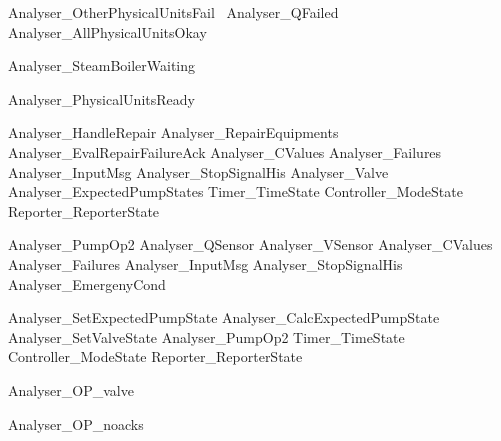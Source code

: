 \documentclass{article}
\begin{document}
\begin{zed}
	Analyser\_OtherPhysicalUnitsFail ~\lnot Analyser\_QFailed \land \lnot Analyser\_AllPhysicalUnitsOkay
\end{zed}

\begin{zed}
	Analyser\_SteamBoilerWaiting 
\end{zed}

\begin{zed}
	Analyser\_PhysicalUnitsReady 
\end{zed}

\begin{zed}
	Analyser\_HandleRepair  Analyser\_RepairEquipments \land Analyser\_EvalRepairFailureAck \land \Xi Analyser\_CValues \land \Xi Analyser\_Failures \land \Xi Analyser\_InputMsg \land \Xi Analyser\_StopSignalHis \land \Xi Analyser\_Valve \land \Xi Analyser\_ExpectedPumpStates \land \Xi Timer\_TimeState \land \Xi Controller\_ModeState \land \Xi Reporter\_ReporterState
\end{zed}

\begin{zed}
	Analyser\_PumpOp2  \Xi Analyser\_QSensor \land \Xi Analyser\_VSensor \land \Xi Analyser\_CValues \land \Xi Analyser\_Failures \land \Xi Analyser\_InputMsg \land \Xi Analyser\_StopSignalHis \land \Xi Analyser\_EmergenyCond
\end{zed}

\begin{zed}
	Analyser\_SetExpectedPumpState  Analyser\_CalcExpectedPumpState \land Analyser\_SetValveState \land Analyser\_PumpOp2 \land \Xi Timer\_TimeState \land \Xi Controller\_ModeState \land \Xi Reporter\_ReporterState
\end{zed}

\begin{zed}
	Analyser\_OP\_valve 
\end{zed}

\begin{zed}
	Analyser\_OP\_noacks 
\end{zed}
\end{document}
